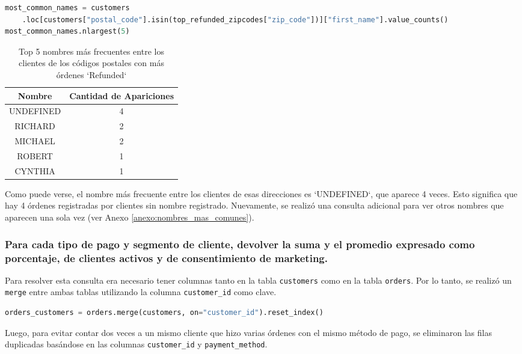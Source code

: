 \begin{lstlisting}[language=Python, xleftmargin=20pt, xrightmargin=20pt]
most_common_names = customers
    .loc[customers["postal_code"].isin(top_refunded_zipcodes["zip_code"])]["first_name"].value_counts()
most_common_names.nlargest(5)
\end{lstlisting}
\begin{table}[H]
\centering
\begin{tabular}{|c|c|}
\hline
\textbf{Nombre} & \textbf{Cantidad de Apariciones} \\
\hline
UNDEFINED & 4 \\
RICHARD & 2 \\
MICHAEL & 2 \\
ROBERT & 1 \\
CYNTHIA & 1 \\
\hline
\end{tabular}
\caption{Top 5 nombres más frecuentes entre los clientes de los códigos postales con más órdenes `Refunded`}
\end{table}

Como puede verse, el nombre más frecuente entre los clientes de esas direcciones es `UNDEFINED`, que aparece 4 veces. Esto significa que hay 4 órdenes registradas por clientes sin nombre registrado. Nuevamente, se realizó una consulta adicional para ver otros nombres que aparecen una sola vez (ver Anexo \ref{anexo:nombres_mas_comunes}).

\subsubsection{Para cada tipo de pago y segmento de cliente, devolver la suma y el promedio expresado como porcentaje, de clientes activos y de consentimiento de marketing.}

Para resolver esta consulta era necesario tener columnas tanto en la tabla \texttt{customers} como en la tabla \texttt{orders}. Por lo tanto, se realizó un \texttt{merge} entre ambas tablas utilizando la columna \texttt{customer\_id} como clave.

\begin{lstlisting}[language=Python, xleftmargin=78pt, xrightmargin=78pt]
orders_customers = orders.merge(customers, on="customer_id").reset_index()
\end{lstlisting}

Luego, para evitar contar dos veces a un mismo cliente que hizo varias órdenes con el mismo método de pago, se eliminaron las filas duplicadas basándose en las columnas \texttt{customer\_id} y \texttt{payment\_method}. 

